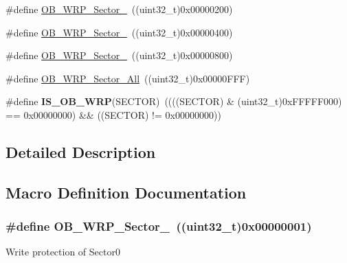 \begin{DoxyCompactItemize}
\item 
\#define \hyperlink{group___option___bytes___write___protection_ga5441787d51d48a73f85f2f8efe7f2992}{O\-B\-\_\-\-W\-R\-P\-\_\-\-Sector\-\_}~((uint32\-\_\-t)0x00000200)
\item 
\#define \hyperlink{group___option___bytes___write___protection_ga886ff84dee003a1fbb6de64bf9465455}{O\-B\-\_\-\-W\-R\-P\-\_\-\-Sector\-\_}~((uint32\-\_\-t)0x00000400)
\item 
\#define \hyperlink{group___option___bytes___write___protection_gadd07be676785c86096ad546f2e792d17}{O\-B\-\_\-\-W\-R\-P\-\_\-\-Sector\-\_}~((uint32\-\_\-t)0x00000800)
\item 
\#define \hyperlink{group___option___bytes___write___protection_ga049185e634497456e6d3c7b3dca214d6}{O\-B\-\_\-\-W\-R\-P\-\_\-\-Sector\-\_\-\-All}~((uint32\-\_\-t)0x00000\-F\-F\-F)
\item 
\hypertarget{group___option___bytes___write___protection_ga4bd8f8ce63ce60bac832efbfbb4fa564}{\#define {\bfseries I\-S\-\_\-\-O\-B\-\_\-\-W\-R\-P}(S\-E\-C\-T\-O\-R)~((((S\-E\-C\-T\-O\-R) \& (uint32\-\_\-t)0x\-F\-F\-F\-F\-F000) == 0x00000000) \&\& ((\-S\-E\-C\-T\-O\-R) != 0x00000000))}\label{group___option___bytes___write___protection_ga4bd8f8ce63ce60bac832efbfbb4fa564}

\end{DoxyCompactItemize}


\subsection{Detailed Description}


\subsection{Macro Definition Documentation}
\hypertarget{group___option___bytes___write___protection_gaff0ba34d35179bdc6e2f09d6813290f6}{
\subsubsection[{O\-B\-\_\-\-W\-R\-P\-\_\-\-Sector\-\_\-0}]{\setlength{\rightskip}{0pt plus 5cm}\#define O\-B\-\_\-\-W\-R\-P\-\_\-\-Sector\-\_~((uint32\-\_\-t)0x00000001)}}\label{group___option___bytes___write___protection_gaff0ba34d35179bdc6e2f09d6813290f6}
Write protection of Sector0 

